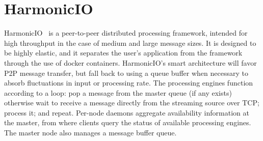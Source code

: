 \documentclass[conference]{IEEEtran}
\begin{document}



\section{HarmonicIO} \label{hio}

HarmonicIO~\cite{torruangwatthanaHarmonicIOScalableData2018} is a peer-to-peer distributed processing framework, intended for high throughput in the case of medium and large message sizes. It is designed to be highly elastic, and it separates the user's application from the framework through the use of docker containers. HarmonicIO's smart architecture will favor P2P message transfer, but fall back to using a queue buffer when necessary to absorb fluctuations in input or processing rate. The processing engines function according to a loop: pop a message from the master queue (if any exists) otherwise wait to receive a message directly from the streaming source over TCP; process it; and repeat. Per-node daemons aggregate availability information at the master, from where clients query the status of available processing engines. The master node also manages a message buffer queue.

\end{document}

